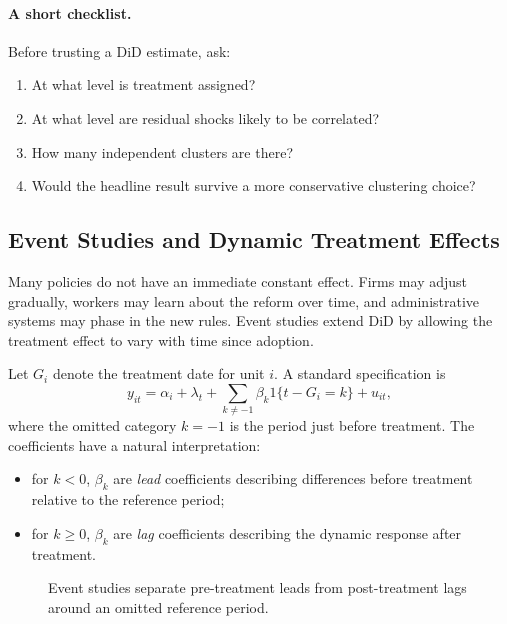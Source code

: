 \paragraph{A short checklist.}
Before trusting a \ac{DiD} estimate, ask:
\begin{enumerate}
\item At what level is treatment assigned?
\item At what level are residual shocks likely to be correlated?
\item How many independent clusters are there?
\item Would the headline result survive a more conservative clustering choice?
\end{enumerate}

\subsection{Event Studies and Dynamic Treatment Effects}
Many policies do not have an immediate constant effect. Firms may adjust gradually, workers may learn about the reform over time, and administrative systems may phase in the new rules. Event studies extend \ac{DiD} by allowing the treatment effect to vary with time since adoption.

Let $G_i$ denote the treatment date for unit $i$. A standard specification is
\begin{equation}
y_{it} = \alpha_i + \lambda_t + \sum_{k \neq -1}\beta_k 1\{t-G_i=k\} + u_{it},
\label{eq:event_study}
\end{equation}
where the omitted category $k=-1$ is the period just before treatment. The coefficients have a natural interpretation:
\begin{itemize}
\item for $k<0$, $\beta_k$ are \emph{lead} coefficients describing differences before treatment relative to the reference period;
\item for $k\geq 0$, $\beta_k$ are \emph{lag} coefficients describing the dynamic response after treatment.
\end{itemize}

\begin{figure}[h]
\centering
{}
\caption{Event studies separate pre-treatment leads from post-treatment lags around an omitted reference period.}
\label{fig:event_study_schematic}
\end{figure}

